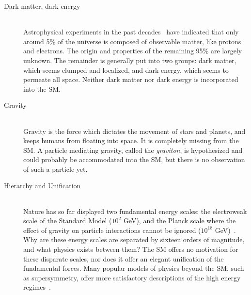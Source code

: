 \begin{description}

    \item[Dark matter, dark energy] \hfill \\
      Astrophysical experiments in the past decades~\cite{2006.darkmatter,2013.planck} have indicated that only around 5\% of the universe is composed of observable matter, like protons and electrons. The origin and properties of the remaining 95\% are largely unknown. The remainder is generally put into two groups: dark matter, which seems clumped and localized, and dark energy, which seems to permeate all space. Neither dark matter nor dark energy is incorporated into the SM.

    \item[Gravity] \hfill \\
      Gravity is the force which dictates the movement of stars and planets, and keeps humans from floating into space. It is completely missing from the SM. A particle mediating gravity, called the \textit{graviton}, is hypothesized and could probably be accommodated into the SM, but there is no observation of such a particle yet.

    \item[Hierarchy and Unification] \hfill \\
      Nature has so far displayed two fundamental energy scales: the electroweak scale of the Standard Model ($10^{2}$ GeV), and the Planck scale where the effect of gravity on particle interactions cannot be ignored ($10^{18}$ GeV)~\cite{1998.hierarchy}. Why are these energy scales are separated by sixteen orders of magnitude, and what physics exists between them? The SM offers no motivation for these disparate scales, nor does it offer an elegant unification of the fundamental forces. Many popular models of physics beyond the SM, such as supersymmetry, offer more satisfactory descriptions of the high energy regimes~\cite{1997.susyprimer}.

\end{description}

